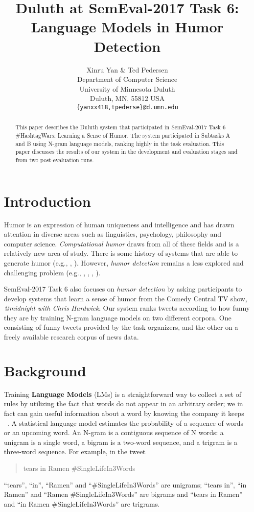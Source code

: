 \documentclass[11pt,a4paper]{article}
\title{Duluth at SemEval-2017 Task 6:  Language Models in Humor Detection}
\author{Xinru Yan \& Ted Pedersen\\
  Department of Computer Science \\ University of Minnesota Duluth \\ Duluth, MN, 55812 USA \\
  {\tt \{yanxx418,tpederse\}@d.umn.edu}}
\date{}
\begin{document}
\maketitle
\begin{abstract}
This paper describes the Duluth system that participated in 
SemEval-2017 Task 6 \#HashtagWars: 
Learning a Sense of Humor. The system participated in 
Subtasks A and B using N-gram 
language models, ranking highly in the task evaluation. 
This paper discusses the results of 
our system in the development and evaluation stages 
and from two post-evaluation runs. 
\end{abstract}

\section{Introduction}
Humor is an expression of  human uniqueness and intelligence and has drawn 
attention in diverse areas such as linguistics, psychology, philosophy and 
computer science. \textit{Computational humor} draws from all of these 
fields and is a relatively new area of study. 
There is some history of systems that are able to generate 
humor (e.g., \cite{StockS03}, \cite{ozbal2012computational}). 
However, \textit{humor detection} remains a less explored 
and challenging problem (e.g., \cite{Learning:To:Laugh}, 
\cite{Recognizing:Humor:On:Twitter}, \cite{ShahafHM15}, \cite{MillerG15}). 

SemEval-2017 Task 6 \cite{PotashRR17} 
also focuses on \textit{humor detection} by asking participants to 
develop systems that 
learn a sense of humor from the Comedy Central TV show, 
\textit{@midnight with Chris Hardwick}. Our system 
ranks tweets according to how funny they are
by training N-gram language models 
on two different corpora. One consisting of funny tweets 
provided by the task organizers, and 
the other on a freely available research corpus of news data. 

\section{Background}

Training \textbf{Language Models} (LMs) is a straightforward 
way to collect a set of rules by 
utilizing the fact that words do not appear in an arbitrary order; 
we in fact can gain useful information about a word by knowing 
the company it keeps ~\cite{Firth57}. A statistical language 
model estimates the probability of a sequence of words or an upcoming 
word. 
An N-gram is a contiguous sequence of N words: a unigram is a 
single word, a bigram is a two-word sequence, 
and a trigram is a three-word sequence. For example, in the tweet 
\begin{quote}
tears in Ramen \#SingleLifeIn3Words
\end{quote}
``tears'', ``in'', ``Ramen'' and ``\#SingleLifeIn3Words'' are unigrams; ``tears in'', 
``in Ramen'' and ``Ramen \#SingleLifeIn3Words'' 
are bigrams and ``tears in Ramen'' and ``in Ramen 
\#SingleLifeIn3Words'' are trigrams.
\end{document}
